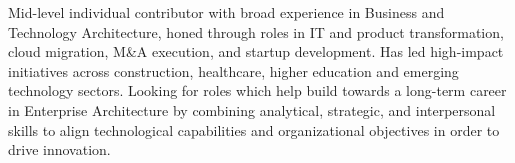 

\begin{cvparagraph}

Mid-level individual contributor with broad experience in Business and Technology Architecture, honed through roles in IT and product transformation, cloud migration, M\&A execution, and startup development. Has led high-impact initiatives across construction, healthcare, higher education and emerging technology sectors. Looking for roles which help build towards a long-term career in Enterprise Architecture by combining analytical, strategic, and interpersonal skills to align technological capabilities and organizational objectives in order to drive innovation.
\end{cvparagraph}